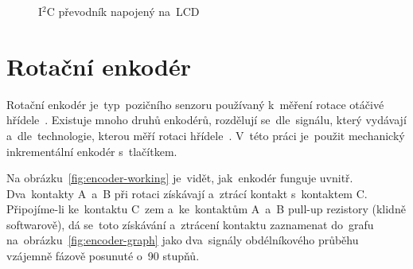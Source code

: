 \begin{figure}[htb]
\begin{minipage}{0.45\textwidth}
    \caption{\label{fig:LCD_back} I$^{2}$C převodník napojený na~LCD~\cite{laskakit-LCD}}
  \end{minipage}
\end{figure}



\section{Rotační enkodér}
Rotační enkodér je~typ~pozičního senzoru používaný k~měření rotace otáčivé hřídele~\cite{how-encoders-work}. Existuje mnoho druhů enkodérů, rozdělují se~dle~signálu, který vydávají a~dle~technologie, kterou měří rotaci hřídele~\cite{how-encoders-work}. V~této práci je~použit mechanický inkrementální enkodér s~tlačítkem.

Na obrázku~\ref{fig:encoder-working} je~vidět, jak~enkodér funguje uvnitř. Dva~kontakty A~a~B při rotaci získávají a~ztrácí kontakt s~kontaktem C. Připojíme-li ke~kontaktu C~zem a~ke~kontaktům A~a~B pull-up rezistory (klidně softwarově), dá se~toto získávání a~ztrácení kontaktu zaznamenat do~grafu na~obrázku~\ref{fig:encoder-graph} jako dva~signály obdélníkového průběhu vzájemně fázově posunuté o~90 stupňů.

